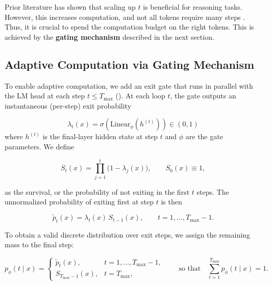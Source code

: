 \documentclass[]{bytedance_seed}
\newcommand{\1}{\mathbf{1}}
\begin{document}
Prior literature \cite{merrill2025little,saunshi2025reasoning} has shown that scaling up $t$ is beneficial for reasoning tasks. However, this increases computation, and not all tokens require many steps \cite{ye2024physics,wang2025beyond}. Thus, it is crucial to spend the computation budget on the right tokens. This is achieved by the \textbf{gating mechanism} described in the next section.

\subsection{Adaptive Computation via Gating Mechanism} 
To enable adaptive computation, we add an exit gate that runs in parallel with the LM head at each step $t \leq T_{\max}$ (). At each loop $t$, the gate outputs an instantaneous (per-step) exit probability

$$
\lambda_t(x) = \sigma\left(\mathrm{Linear}_{\phi}\left(h^{(t)}\right)\right) \in(0,1)
$$
where $h^{(t)}$ is the final-layer hidden state at step $t$ and $\phi$ are the gate parameters. 
We define

$$
S_t(x)=\prod_{j=1}^t\bigl(1-\lambda_j(x)\bigr),\qquad S_0(x)\equiv 1,$$

as the survival, or the probability of not exiting in the first $t$ steps. The unnormalized probability of exiting first at step $t$ is then

$$
\tilde{p}_t(x)=\lambda_t(x)\,S_{t-1}(x),\qquad t=1,\dots,T_{\max}-1.
$$

To obtain a valid discrete distribution over exit steps, we assign the remaining mass to the final step:

\begin{equation}\label{eq:distribution}
p_\phi(t\mid x) =
\begin{cases}
    \tilde p_t(x), & t=1,\dots,T_{\max}-1,\\[3pt]
    S_{T_{\max}-1}(x), & t=T_{\max},
\end{cases}
\qquad\text{so that}\quad \sum_{t=1}^{T_{\max}}p_\phi(t\mid x)=1.
\end{equation}
\end{document}
